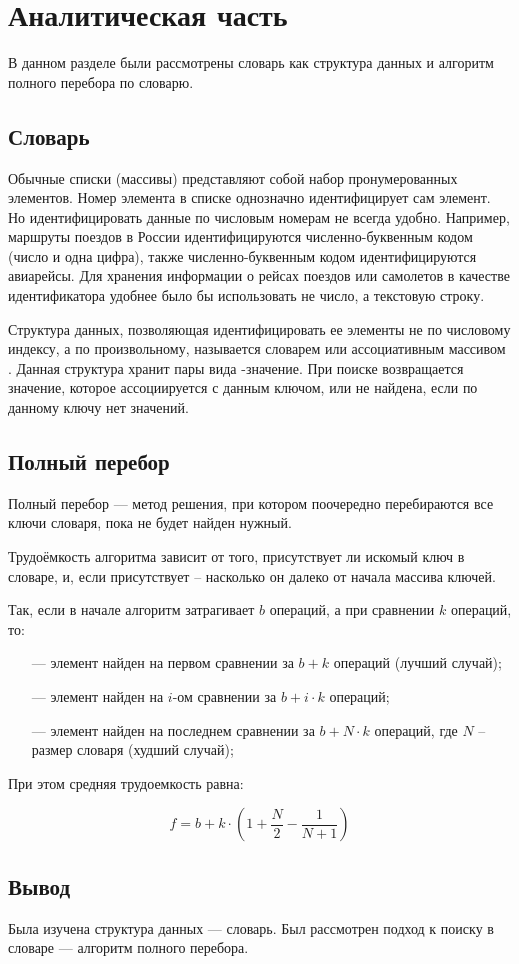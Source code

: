 \chapter{Аналитическая часть}
В данном разделе были рассмотрены словарь как структура данных и алгоритм полного перебора по словарю.

\section{Словарь}

Обычные списки (массивы) представляют собой набор пронумерованных элементов. Номер элемента в списке однозначно идентифицирует сам элемент. Но идентифицировать данные по числовым номерам не всегда удобно. Например, маршруты поездов в России идентифицируются численно-буквенным кодом (число и одна цифра), также численно-буквенным кодом идентифицируются авиарейсы. Для хранения информации о рейсах поездов или самолетов в качестве идентификатора удобнее было бы использовать не число, а текстовую строку.

Структура данных, позволяющая идентифицировать ее элементы не по числовому индексу, а по произвольному, называется словарем или ассоциативным массивом \cite{dict}. Данная структура хранит пары вида -значение\guillemotright. При поиске возвращается значение, которое ассоциируется с данным ключом, или  не найдена\guillemotright, если по данному ключу нет значений.

\section{Полный перебор}

Полный перебор \cite{search-full} --- метод решения, при котором поочередно перебираются все ключи словаря, пока не будет найден нужный.

Трудоёмкость алгоритма зависит от того, присутствует ли искомый ключ в словаре, и, если присутствует -- насколько он далеко от начала массива ключей.

\newpage

Так, если в начале алгоритм затрагивает $b$ операций, а при сравнении $k$ операций, то:
\begin{itemize}
	\item[---] элемент найден на первом сравнении за $b + k$ операций (лучший случай);
	\item[---] элемент найден на $i$-ом сравнении за $b + i \cdot k$ операций;
	\item[---] элемент найден на последнем сравнении за $b +  N \cdot k$ операций, где $N$ -- размер словаря (худший случай);
\end{itemize}

При этом средняя трудоемкость равна:

\begin{equation}
	f = b + k \cdot \left(1 + \frac{N}{2} - \frac{1}{N + 1}\right)
\end{equation}

\section*{Вывод}

Была изучена структура данных --- словарь. Был рассмотрен подход к поиску в словаре --- алгоритм полного перебора.

